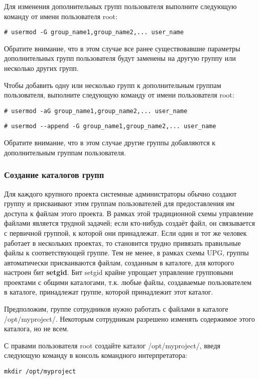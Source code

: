 \documentclass[a4paper,10pt,twoside]{article}
\begin{document}
Для изменения дополнительных групп пользователя выполните следующую команду от имени пользователя root:
\begin{verbatim}
# usermod -G group_name1,group_name2,... user_name\end{verbatim} 

Обратите внимание, что в этом случае все ранее существовавшие параметры дополнительных групп пользователя будут заменены на другую группу или несколько других групп.

Чтобы добавить одну или несколько групп к дополнительным группам пользователя, выполните следующую команду от имени пользователя root:
\begin{verbatim}
# usermod -aG group_name1,group_name2,... user_name
\end{verbatim} 
\begin{verbatim}
# usermod --append -G group_name1,group_name2,... user_name
\end{verbatim} 

Обратите внимание, что в этом случае другие группы добавляются к дополнительным группам пользователя.

\subsubsection{Создание каталогов групп}
Для каждого крупного проекта системные администраторы обычно создают группу и присваивают этим группам пользователей для предоставления им доступа к файлам этого проекта. В рамках этой традиционной схемы управление файлами является трудной задачей; если кто-нибудь создаёт файл, он связывается с первичной группой, к которой они принадлежат. Если один и тот же человек работает в нескольких проектах, то становится трудно привязать правильные файлы к соответствующей группе. Тем не менее, в рамках схемы UPG, группы автоматически присваиваются файлам, созданным в каталоге, для которого настроен бит \textbf{setgid}. Бит setgid крайне упрощает управление групповыми проектами с общими каталогами, т.к. любые файлы, создаваемые пользователем в каталоге, принадлежат группе, которой принадлежит этот каталог.

Предположим, группе сотрудников нужно работать с файлами в каталоге /opt/myproject/. Некоторым сотрудникам разрешено изменять содержимое этого каталога, но не всем.

С правами пользователя root создайте каталог /opt/myproject/, введя следующую команду в консоль командного интерпретатора:
\begin{verbatim}
mkdir /opt/myproject
\end{verbatim} 
\end{document}
